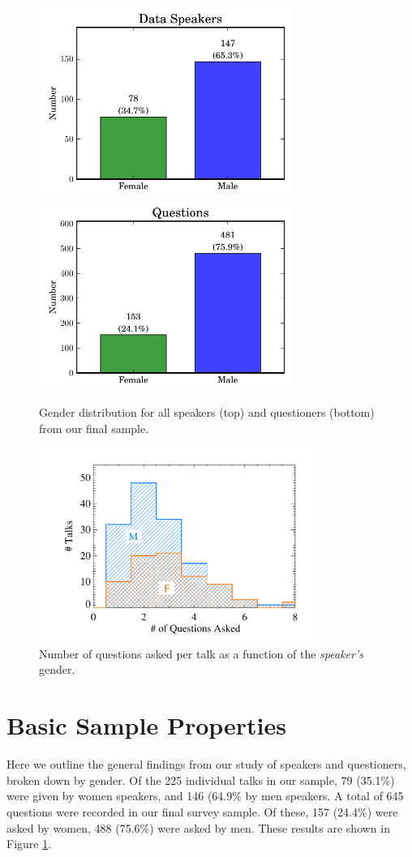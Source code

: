 \documentclass[iop]{emulateapj}
\begin{document}
\begin{figure}[!t]
\centering
\includegraphics[width=3.25in]{speakers_data}
\includegraphics[width=3.25in]{questions}
\caption{Gender distribution for all speakers (top) and questioners (bottom) from our final sample.}
\label{fig:q}
\end{figure}

\begin{figure}[!t]
\centering
\includegraphics[width=3.5in]{n_question_gender}
\caption{Number of questions asked per talk as a function of the {\it speaker's} gender.}
\label{fig:qhist}
\end{figure}


\section{Basic Sample Properties}
Here we outline the general findings from our study of speakers and questioners, broken down by gender.  
Of the 225 individual talks in our sample, 79 (35.1\%) were given by women speakers, and 146 (64.9\% by men speakers. A total of 645 questions were recorded in our final survey sample. Of these, 157 (24.4\%) were asked by women, 488 (75.6\%) were asked by men. These results are shown in Figure \ref{fig:q}.
\end{document}
